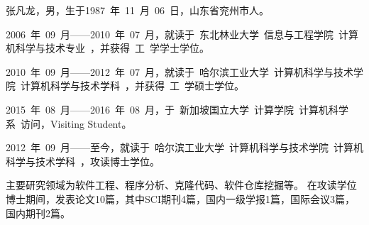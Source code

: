 


张凡龙，男，生于1987~年~11~月~06~日，山东省兖州市人。

2006~年~09~月------2010~年~07~月，就读于~东北林业大学~信息与工程学院~计算机科学与技术专业~，并获得~工~学学士学位。

2010~年~09~月------2012~年~07~月，就读于~哈尔滨工业大学~计算机科学与技术学院~计算机科学与技术学科~，并获得~工~学硕士学位。

2015~年~08~月------2016~年~08~月，于~新加坡国立大学~计算学院~计算机科学系~访问，Visiting Student。

2012~年~09~月------至今，就读于~哈尔滨工业大学~计算机科学与技术学院~计算机科学与技术学科~，攻读博士学位。



主要研究领域为软件工程、程序分析、克隆代码、软件仓库挖掘等。
在攻读学位博士期间，发表论文10篇，其中SCI期刊4篇，国内一级学报1篇，国际会议3篇，国内期刊2篇。%

\vspace{3em}\noindent
